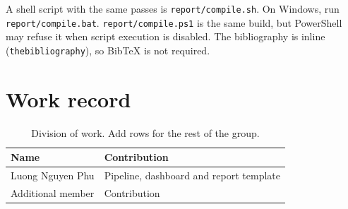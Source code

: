 A shell script with the same passes is \texttt{report/compile.sh}. On
Windows, run \texttt{report/compile.bat}. \texttt{report/compile.ps1} is the
same build, but PowerShell may refuse it when script execution is disabled.
The bibliography is inline (\texttt{thebibliography}), so BibTeX is not required.

\section{Work record}

\begin{table}[h]
  \centering
  \small
  \begin{tabular}{@{}ll@{}}
    \toprule
    Name & Contribution \\
    \midrule
    Luong Nguyen Phu & Pipeline, dashboard and report template \\
    Additional member & Contribution \\
    \bottomrule
  \end{tabular}
  \caption{Division of work. Add rows for the rest of the group.}
  \label{tab:work}
\end{table}
